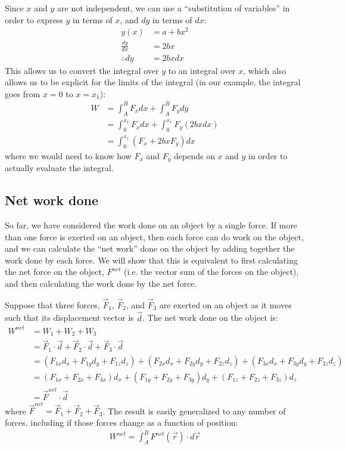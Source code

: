 \begin{example}
Since $x$ and $y$ are not independent, we can use a ``substitution of variables'' in order to express $y$ in terms of $x$, and $dy$ in terms of $dx$:
\begin{align*}
y(x) &= a + bx^2\\
\frac{dy}{dx} &= 2bx\\
\therefore dy &= 2bxdx
\end{align*} 
This allows us to convert the integral over $y$ to an integral over $x$, which also allows us to be explicit for the limits of the integral (in our example, the integral goes from $x=0$ to $x=x_1$):
\begin{align*}
W&= \int_A^B F_x dx + \int_A^B F_ydy\\
&=\int_0^{x_1} F_x dx + \int_0^{x_1} F_y(2bxdx)\\
&=\int_0^{x_1} (F_x + 2bxF_y)dx
\end{align*}
where we would need to know how $F_x$ and $F_y$ depends on $x$ and $y$ in order to actually evaluate the integral.
\end{example}

\subsection{Net work done}
So far, we have considered the work done on an object by a single force. If more than one force is exerted on an object, then each force can do work on the object, and we can calculate the ``net work'' done on the object by adding together the work done by each force. We will show that this is equivalent to first calculating the net force on the object, $F^{net}$ (i.e. the vector sum of the forces on the object), and then calculating the work done by the net force.
 
Suppose that three forces, $\vec F_1$, $\vec F_2$, and $\vec F_3$ are exerted on an object as it moves such that its displacement vector is $\vec d$. The net work done on the object is:
\begin{align*}
W^{net} &= W_1 + W_2 + W_3 \\
&= \vec F_1 \cdot \vec d + \vec F_2 \cdot \vec d  + \vec F_3 \cdot \vec d \\
&=(F_{1x}d_x+F_{1y}d_y+F_{1z}d_z)+ (F_{2x}d_x+F_{2y}d_y+F_{2z}d_z) + (F_{3x}d_x+F_{3y}d_y+F_{3z}d_z)\\
&=(F_{1x} + F_{2x} + F_{3x})d_x+(F_{1y} + F_{2y} + F_{3y})d_y+(F_{1z} + F_{2z} + F_{3z})d_z\\
&=\vec F^{net} \cdot \vec d
\end{align*}
where $\vec F^{net} = \vec F_1 + \vec F_2 + \vec F_3$. The result is easily generalized to any number of forces, including if those forces change as a function of position:
\begin{align*}
W^{net} = \int_A^B F^{net}(\vec r) \cdot d\vec r
\end{align*} 

